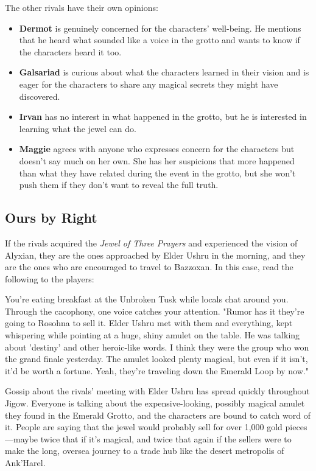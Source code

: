 \documentclass[letterpaper, 11pt, bg=full, twocolumn]{dndbook}
\begin{document}
The other rivals have their own opinions:

\begin{itemize}
\item \textbf{Dermot} is genuinely concerned for the characters' well-being. He mentions that he heard what sounded like a voice in the grotto and wants to know if the characters heard it too.
\item \textbf{Galsariad} is curious about what the characters learned in their vision and is eager for the characters to share any magical secrets they might have discovered.
\item \textbf{Irvan} has no interest in what happened in the grotto, but he is interested in learning what the jewel can do.
\item \textbf{Maggie} agrees with anyone who expresses concern for the characters but doesn't say much on her own. She has her suspicions that more happened than what they have related during the event in the grotto, but she won't push them if they don't want to reveal the full truth.
\end{itemize}

\subsection{Ours by Right}

If the rivals acquired the \textit{Jewel of Three Prayers} and experienced the vision of Alyxian, they are the ones approached by Elder Ushru in the morning, and they are the ones who are encouraged to travel to Bazzoxan. In this case, read the following to the players:

\begin{DndReadAloud}
You're eating breakfast at the Unbroken Tusk while locals chat around you. Through the cacophony, one voice catches your attention.
"Rumor has it they're going to Rosohna to sell it. Elder Ushru met with them and everything, kept whispering while pointing at a huge, shiny amulet on the table. He was talking about 'destiny' and other heroic-like words. I think they were the group who won the grand finale yesterday. The amulet looked plenty magical, but even if it isn't, it'd be worth a fortune. Yeah, they're traveling down the Emerald Loop by now."
\end{DndReadAloud}

Gossip about the rivals' meeting with Elder Ushru has spread quickly throughout Jigow. Everyone is talking about the expensive-looking, possibly magical amulet they found in the Emerald Grotto, and the characters are bound to catch word of it. People are saying that the jewel would probably sell for over 1,000 gold pieces---maybe twice that if it's magical, and twice that again if the sellers were to make the long, oversea journey to a trade hub like the desert metropolis of Ank'Harel.
\end{document}
